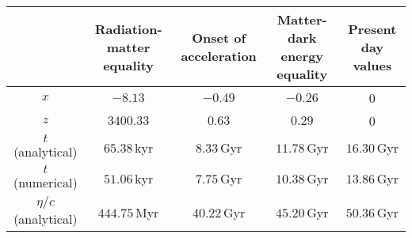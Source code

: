 \documentclass{aa}
\begin{document}
\begin{table*}
  \caption{Key cosmological timestamps at radiation-matter equality, the onset of acceleration, matter-dark energy equality, and present-day values. The analytical values are obtained using approximations from the theory section, while the numerical values are extracted from splines after solving the full system of equations. Discrepancies between the two highlight the limitations of the analytical approximations, especially during transition epochs.}             %
  \label{table:time stamps}      %
  \centering                          %
  \begin{tabular}{| c || c | c | c | c |}        %
  \hline                %
   & Radiation-matter equality & Onset of acceleration & Matter-dark energy equality & Present day values \\    %
  \hline\hline                        %
  \hspace{6pt}$x$\hspace{53pt} & \hspace{8.5pt}$-8.13$ & $-0.49$ & $-0.26$ & 0 \\      %
  \hline 
  \hspace{6pt}$z$\hspace{53pt} & $3400.33$ & \hspace{6.5pt}$0.63$ & \hspace{7pt}$0.29$  & 0 \\
  \hline 
  \hspace{6pt}$t$ \hspace{5pt}(analytical) & \hspace{25pt}$65.38\,$kyr & \hspace{24.5pt}$8.33\,$Gyr & \hspace{19pt}$11.78\,$Gyr & \hspace{25pt}$16.30\,$Gyr \\
  \hspace{6pt}$t$ \hspace{5pt}(numerical) & \hspace{25pt}$51.06\,$kyr & \hspace{24.5pt}$7.75\,$Gyr & \hspace{19pt}$10.38\,$Gyr & \hspace{25pt}$13.86\,$Gyr \\
  \hline 
     $\eta/c$ (analytical) & \hspace{25pt}$444.75\,$Myr & \hspace{20.5pt}$40.22\,$Gyr & \hspace{19pt}$45.20\,$Gyr & \hspace{25pt}$50.36\,$Gyr \\ 

\end{tabular}
\end{table*}
\end{document}

